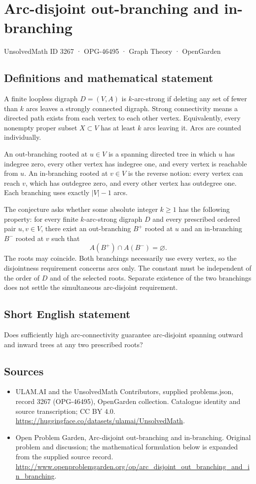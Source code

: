 \documentclass[11pt,a4paper]{article}
\begin{document}
\section*{Arc-disjoint out-branching and in-branching}\label{3267}
{\small UnsolvedMath ID 3267 · OPG-46495 · Graph Theory · OpenGarden}
\subsection{Definitions and mathematical statement}
A finite loopless digraph $D=(V,A)$ is $k$-arc-strong if deleting any set
of fewer than $k$ arcs leaves a strongly connected digraph. Strong
connectivity means a directed path exists from each vertex to each
other vertex. Equivalently, every nonempty proper subset $X\subset V$
has at least $k$ arcs leaving it. Arcs are counted individually.

An out-branching rooted at $u\in V$ is a spanning directed tree in which
$u$ has indegree zero, every other vertex has indegree one, and every
vertex is reachable from $u$. An in-branching rooted at $v\in V$ is the
reverse notion: every vertex can reach $v$, which has outdegree zero,
and every other vertex has outdegree one. Each branching uses exactly
$|V|-1$ arcs.

The conjecture asks whether some absolute integer $k\ge1$ has the
following property: for every finite $k$-arc-strong digraph $D$ and every
prescribed ordered pair $u,v\in V$, there exist an out-branching $B^+$
rooted at $u$ and an in-branching $B^-$ rooted at $v$ such that
\[
                              A(B^+)\cap A(B^-)=\varnothing.
\]
The roots may coincide. Both branchings necessarily use every vertex,
so the disjointness requirement concerns arcs only. The constant must
be independent of the order of $D$ and of the selected roots. Separate
existence of the two branchings does not settle the simultaneous
arc-disjoint requirement.
\subsection{Short English statement}
Does sufficiently high arc-connectivity guarantee arc-disjoint spanning outward and inward trees at any two prescribed roots?
\subsection{Sources}
\begin{itemize}
\item[S1] ULAM.AI and the UnsolvedMath Contributors, supplied problems.json, record 3267 (OPG-46495), OpenGarden collection. Catalogue identity and source transcription; CC BY 4.0.
\url{https://huggingface.co/datasets/ulamai/UnsolvedMath}.
\item[S2] Open Problem Garden, Arc-disjoint out-branching and in-branching. Original problem and discussion; the mathematical formulation below is expanded from the supplied source record.
\url{http://www.openproblemgarden.org/op/arc_disjoint_out_branching_and_in_branching}.
\end{itemize}
\end{document}
